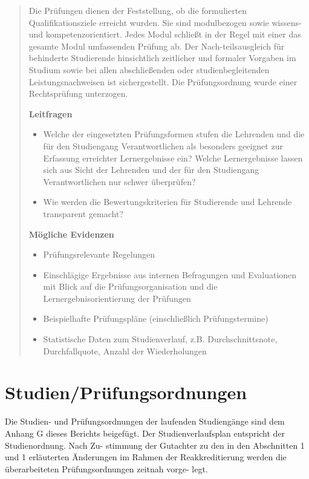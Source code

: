 \begin{quote}
Die Prüfungen dienen der Feststellung, ob die formulierten
Qualifikationsziele erreicht wurden. Sie sind modulbezogen sowie
wissens- und kompetenzorientiert. Jedes Modul schließt in der Regel mit
einer das gesamte Modul umfassenden Prüfung ab. Der Nach-teilsausgleich
für behinderte Studierende hinsichtlich zeitlicher und formaler Vorgaben
im Studium sowie bei allen abschließenden oder studienbegleitenden
Leistungsnachweisen ist sichergestellt. Die Prüfungsordnung wurde einer
Rechtsprüfung unterzogen.

\textbf{Leitfragen}

\begin{itemize}
\item
  Welche der eingesetzten Prüfungsformen stufen die Lehrenden und die
  für den Studiengang Verantwortlichen als besonders geeignet zur
  Erfassung erreichter Lernergebnisse ein? Welche Lernergebnisse lassen
  sich aus Sicht der Lehrenden und der für den Studiengang
  Verantwortlichen nur schwer überprüfen?
\item
  Wie werden die Bewertungskriterien für Studierende und Lehrende
  transparent gemacht?
\end{itemize}

\textbf{Mögliche Evidenzen}

\begin{itemize}
\item
  Prüfungsrelevante Regelungen
\item
  Einschlägige Ergebnisse aus internen Befragungen und Evaluationen mit
  Blick auf die Prüfungsorganisation und die Lernergebnisorientierung
  der Prüfungen
\item
  Beispielhafte Prüfungspläne (einschließlich Prüfungstermine)
\item
  Statistische Daten zum Studienverlauf, z.B. Durchschnittsnote,
  Durchfallquote, Anzahl der Wiederholungen
\end{itemize}
\end{quote}

\section{Studien/Prüfungsordnungen}\label{studienpruxfcfungsordnungen-1}

Die Studien- und Prüfungsordnungen der laufenden Studiengänge sind dem
Anhang G dieses Berichts beigefügt. Der Studienverlaufsplan entspricht
der Studienordnung. Nach Zu- stimmung der Gutachter zu den in den
Abschnitten 1 und 1 erläuterten Änderungen im Rahmen der
Reakkreditierung werden die überarbeiteten Prüfungsordnungen zeitnah
vorge- legt.

